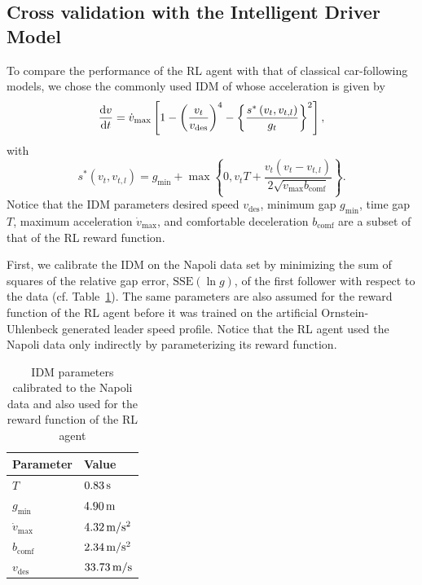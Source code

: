 \documentclass[review]{elsarticle}
\providecommand{\sub}[1]{_{\mathrm{#1}}}  %
\providecommand{\3}{{\ss}}
\begin{document}
	
	\subsection{Cross validation with the Intelligent Driver Model}
	\label{sec:crossValIDM}
	To compare the performance of the RL agent with that of
	classical car-following models, we chose the commonly used
	IDM of \cite{Opus} whose acceleration is given
	by 
	\begin{equation}
	\label{eq:IDM}
	\dv{v}{t}=\dot{v}\sub{max}\left[1-\left(\frac{v_t}{v\sub{des}}\right)^{4}-\left\{\frac{s^{*}\left(v_t, v_{t,l}\right)}{g_t}\right\}^{2}\right],
	\end{equation}
	with
	\begin{equation}
	\label{eq:IDMsstar}
	s^{*}\left(v_t, v_{t,l}\right)=g\sub{min}+\max \left\{0,v_tT+\frac{v_t(v_t-v_{t,l})}{2 \sqrt{\dot{v}\sub{max} b\sub{comf}}}\right\}.
	\end{equation}
	Notice that the IDM parameters desired
	speed $v\sub{des}$, minimum gap $g\sub{min}$, time gap $T$, maximum
	acceleration $\dot{v}\sub{max}$, and
	comfortable deceleration $b\sub{comf}$ are a subset of that of the RL reward
	function. 
	
	First, we calibrate the IDM on the Napoli data set by
	minimizing the sum of squares of the relative gap error,
	$\mathrm{SSE}(\ln g)$, of the first follower with respect to the
	data (cf. Table~\ref{tab:IDMparameters}). The same parameters are also
	assumed for the reward function of the RL agent before it was trained
	on the artificial Ornstein-Uhlenbeck generated leader speed profile. Notice that the RL agent used the Napoli data only
	indirectly by parameterizing its reward function.
	
	\begin{table}
		\caption{IDM parameters calibrated to the Napoli
			data and also used for the reward function of the RL agent}
		\label{tab:IDMparameters} 
		\begin{center}
			\begin{tabular}{ p{} |p{}  } 
				Parameter & Value   \\ \hline
				$T$ & $\unit[0.83]{s}$\\
				$g\sub{min}$ & $\unit[4.90]{m}$\\
				$\dot{v}\sub{max}$ & $\unit[4.32]{m/s^2}$\\
				$b\sub{comf}$ & $\unit[2.34]{ m/s^2}$\\
				$v\sub{des}$ & $\unit[33.73]{m/s}$			
			\end{tabular}
		\end{center}
	\end{table}
	
\end{document}
